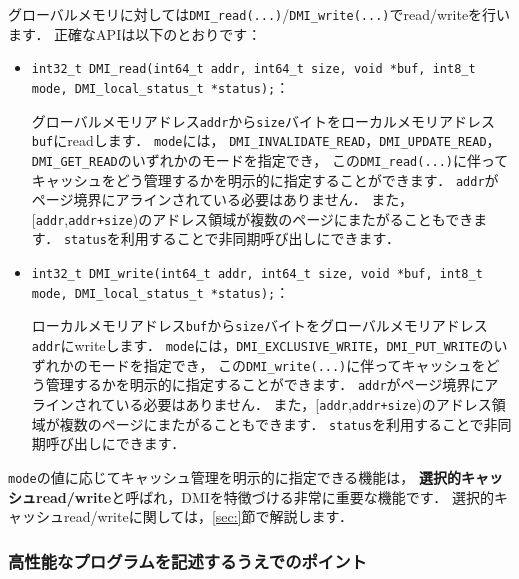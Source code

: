 \documentclass[report,12pt]{jsbook}
\begin{document}
グローバルメモリに対しては\texttt{DMI\_read(...)}/\texttt{DMI\_write(...)}でread/writeを行います．
正確なAPIは以下のとおりです：
\begin{itemize}
\item \texttt{int32\_t DMI\_read(int64\_t addr, int64\_t size, void *buf, int8\_t mode, DMI\_local\_status\_t *status);}：
  
  グローバルメモリアドレス\texttt{addr}から\texttt{size}バイトをローカルメモリアドレス\texttt{buf}にreadします．
  \texttt{mode}には，
  \texttt{DMI\_INVALIDATE\_READ}，\texttt{DMI\_UPDATE\_READ}，\texttt{DMI\_GET\_READ}のいずれかのモードを指定でき，
  この\texttt{DMI\_read(...)}に伴ってキャッシュをどう管理するかを明示的に指定することができます．
  \texttt{addr}がページ境界にアラインされている必要はありません．
  また，[\texttt{addr},\texttt{addr+size})のアドレス領域が複数のページにまたがることもできます．
  \texttt{status}を利用することで非同期呼び出しにできます．
\item \texttt{int32\_t DMI\_write(int64\_t addr, int64\_t size, void *buf, int8\_t mode, DMI\_local\_status\_t *status);}：
  
  ローカルメモリアドレス\texttt{buf}から\texttt{size}バイトをグローバルメモリアドレス\texttt{addr}にwriteします．
  \texttt{mode}には，\texttt{DMI\_EXCLUSIVE\_WRITE}，\texttt{DMI\_PUT\_WRITE}のいずれかのモードを指定でき，
  この\texttt{DMI\_write(...)}に伴ってキャッシュをどう管理するかを明示的に指定することができます．
  \texttt{addr}がページ境界にアラインされている必要はありません．
  また，[\texttt{addr},\texttt{addr+size})のアドレス領域が複数のページにまたがることもできます．
  \texttt{status}を利用することで非同期呼び出しにできます．
\end{itemize}

\texttt{mode}の値に応じてキャッシュ管理を明示的に指定できる機能は，
\textbf{選択的キャッシュread/write}と呼ばれ，DMIを特徴づける非常に重要な機能です．
選択的キャッシュread/writeに関しては，\ref{sec:}節で解説します．

\subsubsection{高性能なプログラムを記述するうえでのポイント}
\end{document}
